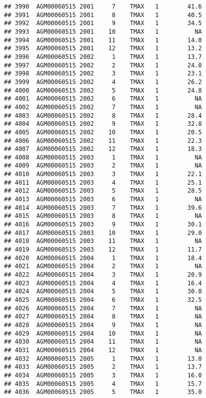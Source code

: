 \documentclass{article}\usepackage[]{graphicx}\usepackage[]{color}
\makeatletter
\newenvironment{kframe}{%
 \def\at@end@of@kframe{}%
 \ifinner\ifhmode%
  \def\at@end@of@kframe{\end{minipage}}%
  \begin{minipage}{\columnwidth}%
 \fi\fi%
 \def\FrameCommand##1{\hskip\@totalleftmargin \hskip-\fboxsep
 \colorbox{shadecolor}{##1}\hskip-\fboxsep
     \hskip-\linewidth \hskip-\@totalleftmargin \hskip\columnwidth}%
 \MakeFramed {\advance\hsize-\width
   \@totalleftmargin\z@ \linewidth\hsize
   \@setminipage}}%
 {\par\unskip\endMakeFramed%
 \at@end@of@kframe}
\newenvironment{knitrout}{}{} %
\makeatother
\begin{document}
\begin{knitrout}
\begin{kframe}
\begin{verbatim}
## 3990  AGM00060515 2001     7    TMAX   1        41.6
## 3991  AGM00060515 2001     8    TMAX   1        40.5
## 3992  AGM00060515 2001     9    TMAX   1        34.5
## 3993  AGM00060515 2001    10    TMAX   1          NA
## 3994  AGM00060515 2001    11    TMAX   1        14.0
## 3995  AGM00060515 2001    12    TMAX   1        13.2
## 3996  AGM00060515 2002     1    TMAX   1        13.7
## 3997  AGM00060515 2002     2    TMAX   1        24.0
## 3998  AGM00060515 2002     3    TMAX   1        23.1
## 3999  AGM00060515 2002     4    TMAX   1        26.2
## 4000  AGM00060515 2002     5    TMAX   1        24.8
## 4001  AGM00060515 2002     6    TMAX   1          NA
## 4002  AGM00060515 2002     7    TMAX   1          NA
## 4003  AGM00060515 2002     8    TMAX   1        28.4
## 4004  AGM00060515 2002     9    TMAX   1        32.8
## 4005  AGM00060515 2002    10    TMAX   1        20.5
## 4006  AGM00060515 2002    11    TMAX   1        22.3
## 4007  AGM00060515 2002    12    TMAX   1        18.3
## 4008  AGM00060515 2003     1    TMAX   1          NA
## 4009  AGM00060515 2003     2    TMAX   1          NA
## 4010  AGM00060515 2003     3    TMAX   1        22.1
## 4011  AGM00060515 2003     4    TMAX   1        25.1
## 4012  AGM00060515 2003     5    TMAX   1        28.5
## 4013  AGM00060515 2003     6    TMAX   1          NA
## 4014  AGM00060515 2003     7    TMAX   1        39.6
## 4015  AGM00060515 2003     8    TMAX   1          NA
## 4016  AGM00060515 2003     9    TMAX   1        30.1
## 4017  AGM00060515 2003    10    TMAX   1        29.0
## 4018  AGM00060515 2003    11    TMAX   1          NA
## 4019  AGM00060515 2003    12    TMAX   1        11.7
## 4020  AGM00060515 2004     1    TMAX   1        18.4
## 4021  AGM00060515 2004     2    TMAX   1          NA
## 4022  AGM00060515 2004     3    TMAX   1        20.9
## 4023  AGM00060515 2004     4    TMAX   1        16.4
## 4024  AGM00060515 2004     5    TMAX   1        30.0
## 4025  AGM00060515 2004     6    TMAX   1        32.5
## 4026  AGM00060515 2004     7    TMAX   1          NA
## 4027  AGM00060515 2004     8    TMAX   1          NA
## 4028  AGM00060515 2004     9    TMAX   1          NA
## 4029  AGM00060515 2004    10    TMAX   1          NA
## 4030  AGM00060515 2004    11    TMAX   1          NA
## 4031  AGM00060515 2004    12    TMAX   1          NA
## 4032  AGM00060515 2005     1    TMAX   1        13.0
## 4033  AGM00060515 2005     2    TMAX   1        13.7
## 4034  AGM00060515 2005     3    TMAX   1        16.0
## 4035  AGM00060515 2005     4    TMAX   1        15.7
## 4036  AGM00060515 2005     5    TMAX   1        35.0

\end{verbatim}
\end{kframe}
\end{knitrout}
\end{document}
